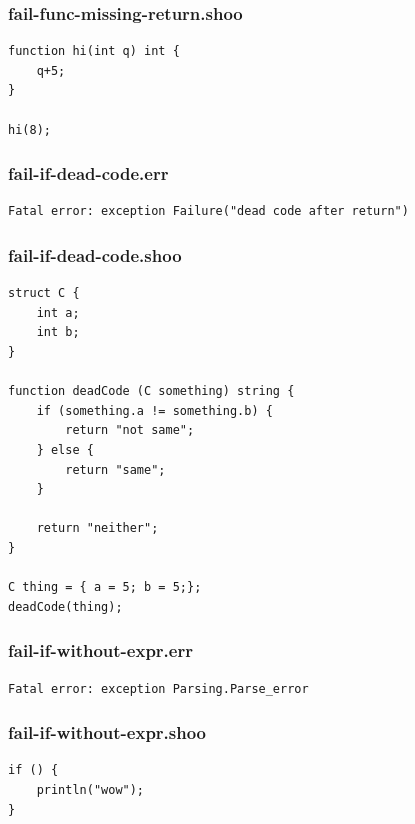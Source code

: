 \documentclass[12pt]{article}
\begin{document}
\subsubsection{fail-func-missing-return.shoo}
\begin{mdframed}[hidealllines=true,backgroundcolor=blue!10]
\begin{lstlisting}
function hi(int q) int {
    q+5;
}

hi(8);
\end{lstlisting}
\end{mdframed}
\subsubsection{fail-if-dead-code.err}
\begin{mdframed}[hidealllines=true,backgroundcolor=green!10]
\begin{lstlisting}
Fatal error: exception Failure("dead code after return")
\end{lstlisting}
\end{mdframed}
\subsubsection{fail-if-dead-code.shoo}
\begin{mdframed}[hidealllines=true,backgroundcolor=blue!10]
\begin{lstlisting}
struct C {
    int a;
    int b;
}

function deadCode (C something) string {
    if (something.a != something.b) {
        return "not same";
    } else {
        return "same";
    }   

    return "neither";
}

C thing = { a = 5; b = 5;};
deadCode(thing);
\end{lstlisting}
\end{mdframed}
\subsubsection{fail-if-without-expr.err}
\begin{mdframed}[hidealllines=true,backgroundcolor=green!10]
\begin{lstlisting}
Fatal error: exception Parsing.Parse_error
\end{lstlisting}
\end{mdframed}
\subsubsection{fail-if-without-expr.shoo}
\begin{mdframed}[hidealllines=true,backgroundcolor=blue!10]
\begin{lstlisting}
if () {
    println("wow");
}
\end{lstlisting}
\end{mdframed}
\end{document}
